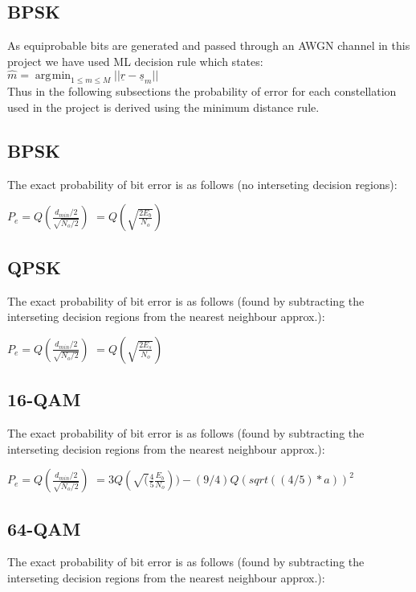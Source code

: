 \documentclass[]{article}
\DeclareMathOperator*{\argmin}{\arg\!\min}
\begin{document}
\subsection{BPSK}
\label{sec:bpsk}

As equiprobable bits are generated and passed through an AWGN channel in this project we have used ML decision rule which states: \\

$\hat{m} = \argmin_{1\leq m \leq M}{||\underline{r} - \underline{s}_m||}$ 
\\

Thus in the following subsections the probability of error for each constellation used in the project is derived using the minimum distance rule.


\subsection{BPSK}
The exact probability of bit error is as follows (no interseting decision regions):

$ P_e = Q(\frac{d_{min}/2}{\sqrt{N_o/2}}) $
$       = Q(\sqrt{\frac{2E_b}{N_o}}) $

\subsection{QPSK}
\label{sec:qpsk}

The exact probability of bit error is as follows (found by subtracting the interseting decision regions from the nearest neighbour approx.):

$ P_e = Q(\frac{d_{min}/2}{\sqrt{N_o/2}}) $
$       = Q(\sqrt{\frac{2E_s}{N_o}}) $ 

\subsection{16-QAM}
\label{sec:qam16}

The exact probability of bit error is as follows (found by subtracting the interseting decision regions from the nearest neighbour approx.):

$ P_e = Q(\frac{d_{min}/2}{\sqrt{N_o/2}}) $
$       = 3Q(\sqrt(\frac{4}{5}\frac{E_b}{N_o}))-(9/4)Q(sqrt((4/5)*a))^2$ 

\subsection{64-QAM}
\label{sec:qam64}
The exact probability of bit error is as follows (found by subtracting the interseting decision regions from the nearest neighbour approx.):
\end{document}
